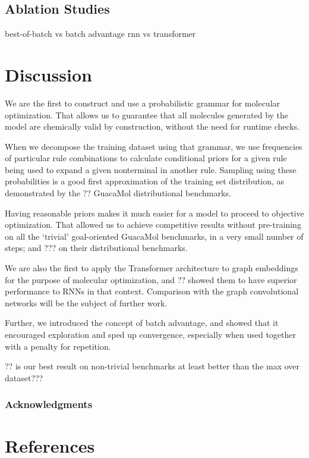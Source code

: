 \documentclass{article}
\begin{document}
\subsection{Ablation Studies}
best-of-batch vs batch advantage
rnn vs transformer

\section{Discussion}
We are the first to construct and use a probabilistic grammar for molecular optimization. That allows us to guarantee that all molecules generated by the model are chemically valid by construction, without the need for runtime checks. 

When we decompose the training dataset using that grammar, we use frequencies of particular rule combinations to calculate conditional priors for a given rule being used to expand a given nonterminal in another rule. Sampling using these probabilities is a good first approximation of the training set distribution, as demonstrated by the ?? GuacaMol distributional benchmarks.

Having reasonable priors makes it much easier for a model to proceed to objective optimization. That allowed us to achieve competitive results without pre-training on all the `trivial' goal-oriented GuacaMol benchmarks, in a very small number of steps;  and ??? on their distributional benchmarks.

We are also the first to apply the Transformer architecture to graph embeddings for the purpose of molecular optimization, and ?? showed them to have superior performance to RNNs in that context. Comparison with the graph convolutional networks will be the subject of further work.

Further, we introduced the concept of batch advantage, and showed that it encouraged exploration and sped up convergence, especially when used together with a penalty for repetition.

?? is our best result on non-trivial benchmarks at least better than the max over dataset???


\subsubsection*{Acknowledgments}

\section*{References}
\medskip

\small
 

\end{document}
